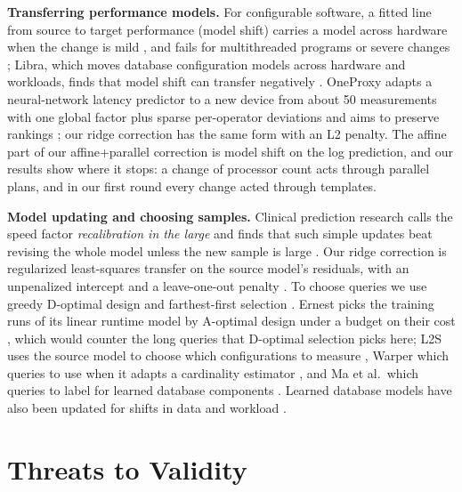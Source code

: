 \documentclass[conference]{IEEEtran}
\begin{document}
\textbf{Transferring performance models.} For configurable software, a
fitted line from source to target performance (model shift) carries a model
across hardware when the change is mild \cite{valov2017,jamshidi2017}, and
fails for multithreaded programs or severe changes
\cite{valov2020,jamshidi2017,jamshidi2018}; Libra, which moves database
configuration models across hardware and workloads, finds that model shift
can transfer negatively \cite{nakamori2026libra}. OneProxy adapts a
neural-network latency predictor to a new device from about 50 measurements
with one global factor plus sparse per-operator deviations and aims to
preserve rankings \cite{lu2021oneproxy}; our ridge correction has the same
form with an L2 penalty. The affine part of our affine+parallel correction
is model shift on the log prediction, and our results show where it stops:
a change of processor count acts through parallel plans, and in our first
round every change acted through templates.

\textbf{Model updating and choosing samples.} Clinical prediction research
calls the speed factor \emph{recalibration in the large} and finds that such
simple updates beat revising the whole model unless the new sample is large
\cite{steyerberg2004,vergouwe2017}. Our ridge correction is regularized
least-squares transfer on the source model's residuals, with an unpenalized
intercept and a leave-one-out penalty \cite{kuzborskij2013}. To choose
queries we use greedy D-optimal design \cite{wynn1970,mitchell1974} and
farthest-first selection \cite{gonzalez1985,sener2018}. Ernest picks the
training runs of its linear runtime model by A-optimal design under a budget
on their cost \cite{venkataraman2016ernest}, which would counter the long
queries that D-optimal selection picks here; L2S uses the source model to
choose which configurations to measure \cite{jamshidi2018}, Warper which
queries to use when it adapts a cardinality estimator \cite{li2022warper},
and Ma et al.\ which queries to label for learned database components
\cite{ma2020active}. Learned database models have also been updated for
shifts in data and workload \cite{kurmanji2023,wui2024}.

\section{Threats to Validity}
\label{sec:threats}
\end{document}
